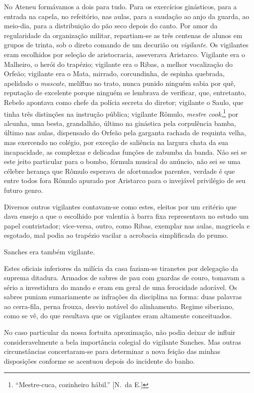 No Ateneu formávamos a dois para tudo.
Para os exercícios ginásticos, para a entrada na capela, no refeitório,
nas aulas, para a saudação ao anjo da guarda, ao meio{}-dia, para a
distribuição do pão seco depois do canto. Por amor da 
regularidade da organização militar,
repartiam{}-se as três centenas de alunos em grupos de trinta, sob o
direto comando de um decurião ou \textit{vigilante}. Os vigilantes eram
escolhidos por seleção de aristocracia, asseverava Aristarco. Vigilante
era o Malheiro, o herói do trapézio; vigilante era o Ribas, a melhor
vocalização do Orfeão; vigilante era o Mata, mirrado, corcundinha, de
espinha quebrada, apelidado o \textit{mascate}, melífluo no trato, nunca punido
ninguém sabia por quê, reputação de excelente porque ninguém se
lembrava de verificar, que, entretanto, Rebelo apontava como chefe da
polícia secreta do diretor; vigilante o Saulo, que tinha três
distinções na instrução pública; vigilante Rômulo, \textit{mestre cook},\footnote{ ``Mestre-cuca, 
cozinheiro hábil.'' [N.~da E.]} por
alcunha, uma besta, grandalhão, último na ginástica pela corpulência
bamba, último nas aulas, dispensado do Orfeão pela garganta rachada de
requinta velha, mas exercendo no colégio, por exceção de saliência na
largura chata da sua incapacidade, as complexas e delicadas funções de
zabumba da banda. Não sei se este jeito particular para o bombo,
fórmula musical do anúncio, não sei se uma célebre herança que Rômulo
esperava de afortunados parentes, verdade é que entre todos fora Rômulo
apurado por Aristarco para o invejável privilégio de seu futuro genro.

Diversos outros vigilantes contavam{}-se como estes, eleitos por um
critério que dava ensejo a que o escolhido por valentia à barra fixa
representava no estudo um papel contristador; vice{}-versa, outro, como
Ribas, exemplar nas aulas, magricela e esgotado, mal podia ao trapézio
vacilar a acrobacia simplificada do prumo. 

Sanches era também vigilante. 

Estes oficiais inferiores da milícia da casa faziam{}-se
tiranetes por delegação da suprema ditadura. Armados de sabres de pau
com guardas de couro, tomavam a sério a investidura do mando e eram em
geral de uma ferocidade adorável. Os sabres puniam sumariamente as
infrações da disciplina na forma: duas palavras ao cerra{}-fila, perna
frouxa, desvio notável do alinhamento. Regime siberiano, como se vê, do
que resultava que os vigilantes eram altamente conceituados. 

No caso particular da nossa fortuita aproximação, não podia deixar de influir
consideravelmente a bela importância colegial do vigilante Sanches. Mas
outras circunstâncias concertaram{}-se para determinar a nova feição
das minhas disposições conforme se acentuou depois do incidente do banho. 

